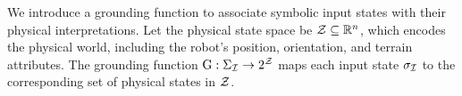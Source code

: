 
We introduce a grounding function to associate symbolic input states with their physical interpretations. Let the physical state space be ${\mathcal Z} \subseteq \mathbb{R}^n$, which encodes the physical world, including the robot’s position, orientation, and terrain attributes. The grounding function $\textrm{G}: \Sigma_{\mathcal I} \to 2^{\mathcal Z}$ maps each input state $\sigma_{\mathcal I}$ to the corresponding set of physical states in ${\mathcal Z}$.


